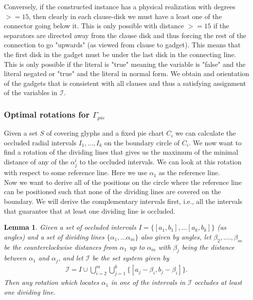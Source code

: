 \documentclass[a4paper,11pt]{article}
\newtheorem{lemma}{Lemma}
\begin{document}
Conversely, if the constructed instance has a physical realization with degrees $>= 15$, then clearly in each clause-disk we must have a least one of the connector going below it. This is only possible with distance $>= 15$ if the separators are directed away from the clause disk and thus forcing the rest of the connection to go "upwards" (as viewed from clause to gadget). This means that the first disk in the gadget must be under the last disk in the connecting line. This is only possible if the literal is "true" meaning the variable is "false" and the literal negated or "true" and the literal in normal form. We obtain and orientation of the gadgets that is consistent with all clauses and thus a satisfying assignment of the variables in $\mathcal{I}$.

\subsubsection*{Optimal rotations for $\Gamma_{pie}$}

Given a set $S$ of covering glyphs and a fixed pie chart $C_i$ we can calculate the occluded radial intervals $I_1,...,I_k$ on the boundary circle of $C_i$. We now want to find a rotation of the dividing lines that gives us the maximum of the minimal distance of any of the $\alpha^i_j$ to the occluded intervals. We can look at this rotation with respect to some reference line. Here we use $\alpha_1$ as the reference line.\\

Now we want to derive all of the positions on the circle where the reference line can be positioned such that none of the dividing lines are covered on the boundary. We will derive the complementary intervals first, i.e., all the intervals that guarantee that at least one dividing line is occluded.

\begin{lemma}
  Given a set of occluded intervals $I=\{[a_1,b_1],...[a_k,b_k]\}$ (as angles) and a set of dividing lines $\{\alpha_1,...\alpha_m\}$ also given by angles, let $\beta_2,....,\beta_m$ be the counterclockwise distances from $\alpha_1$ up to $\alpha_m$ with $\beta_j$ being the distance between $\alpha_1$ and $\alpha_j$, and let $\mathcal{I}$ be the set system given by
  \begin{align*}
    \mathcal{I}=I \cup \bigcup_{i=2}^m    \bigcup_{j=1}^k \{ [a_j-\beta_i,b_j-\beta_i]   \}.
  \end{align*}
  Then any rotation which locates $\alpha_1$ in one of the intervals in $\mathcal{I}$ occludes at least one dividing line.
\end{lemma}
\end{document}
